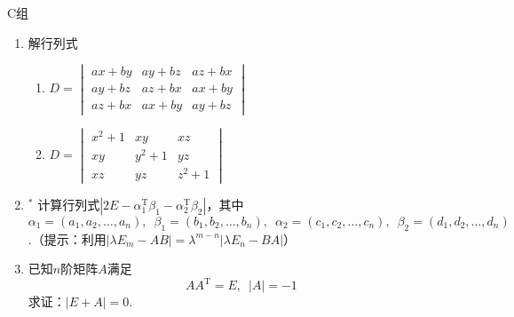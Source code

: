 \centerline{\heiti C组}
\begin{enumerate}
    \item 解行列式
          \begin{multicols}{2} \begin{enumerate}
                  \item $D=\begin{vmatrix}
                                ax+by & ay+bz & az+bx \\
                                ay+bz & az+bx & ax+by \\
                                az+bx & ax+by & ay+bz
                            \end{vmatrix}$

                  \item $D=\begin{vmatrix}
                                x^2+1 & xy    & xz    \\
                                xy    & y^2+1 & yz    \\
                                xz    & yz    & z^2+1
                            \end{vmatrix}$
              \end{enumerate} \end{multicols}

    \item $^*$ 计算行列式$|2E-\alpha_1^\mathrm{T}\beta_1-\alpha_2^\mathrm{T}\beta_2|$，其中$\alpha_1=(a_1,a_2,\ldots,a_n),\enspace \beta_1=(b_1,b_2,\ldots,b_n),\enspace \alpha_2=(c_1,c_2,\ldots,c_n),\enspace \beta_2 = (d_1,d_2,\ldots,d_n)$.（提示：利用$|\lambda E_m-AB|=\lambda^{m-n}|\lambda E_n-BA|$）

    \item 已知$n$阶矩阵$A$满足
          \[ AA^\mathrm{T}=E,\enspace |A|=-1 \]
          求证：$|E+A|=0$.
\end{enumerate}
